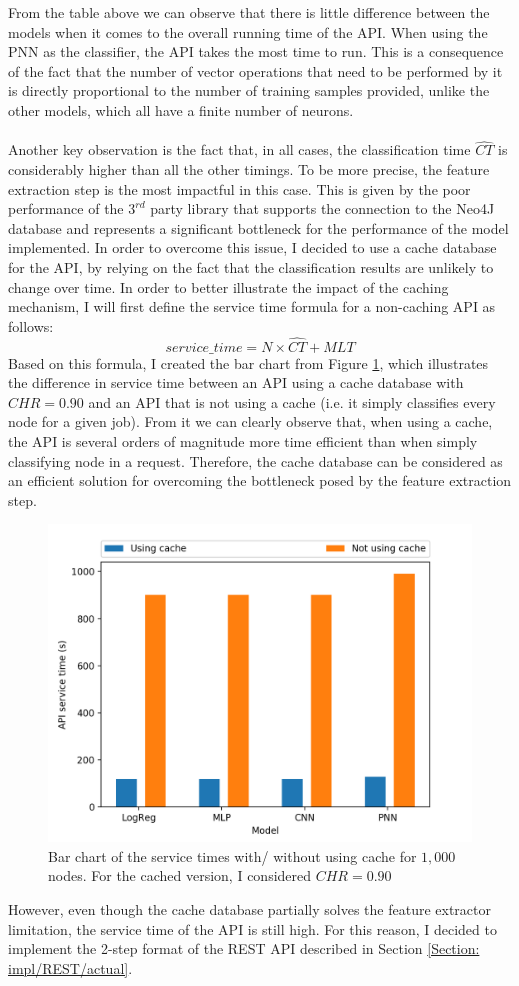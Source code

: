 			From the table above we can observe that there is little difference between the models when it comes to the overall running time of the API. When using the PNN as the classifier, the API takes the most time to run. This is a consequence of the fact that the number of vector operations that need to be performed by it is directly proportional to the number of training samples provided, unlike the other models, which all have a finite number of neurons. 
			\\ \\
			Another key observation is the fact that, in all cases, the classification time $\hat{CT}$ is considerably higher than all the other timings. To be more precise, the feature extraction step is the most impactful in this case. This is given by the poor performance of the $3^{rd}$ party library that supports the connection to the Neo4J database and represents a significant bottleneck for the performance of the model implemented. In order to overcome this issue, I decided to use a cache database for the API, by relying on the fact that the classification  results are unlikely to change over time. In order to better illustrate the impact of the caching mechanism, I will first define the service time formula for a non-caching API as follows:
			\begin{equation}
				service\_time = N \times \hat{CT} + MLT
			\end{equation}
			Based on this formula, I created the bar chart from Figure \ref{Fig: eval/service-time/bringing/bar}, which illustrates the difference in service time between an API using a cache database with $CHR=0.90$ and an API that is not using a cache (i.e. it simply classifies every node for a given job). From it we can clearly observe that, when using a cache, the API is several orders of magnitude more time efficient than when simply classifying node in a request. Therefore, the cache database can be considered as an efficient solution for overcoming the bottleneck posed by the feature extraction step.  
			\begin{figure}[H]
				\centering
				\includegraphics[width=.7\textwidth]{graphics/service-time-hist}
				\caption{Bar chart of the service times with/ without using cache for $1,000$ nodes. For the cached version, I considered $CHR=0.90$}
				\label{Fig: eval/service-time/bringing/bar}
			\end{figure}
			However, even though the cache database partially solves the feature extractor limitation, the service time of the API is still high. For this reason, I decided to implement the 2-step format of the REST API described in Section \ref{Section: impl/REST/actual}.
